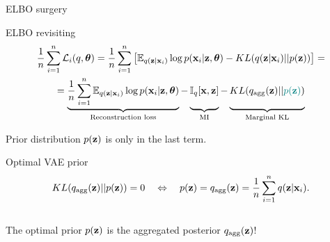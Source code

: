 \begin{frame}{ELBO surgery}
	\begin{block}{ELBO revisiting}
		\vspace{-0.7cm}
		\begin{multline*}
		    \frac{1}{n}\sum_{i=1}^n \cL_i(q, \btheta) = \frac{1}{n} \sum_{i=1}^n \left[ \mathbb{E}_{q(\bz | \bx_i)} \log p(\bx_i | \bz, \btheta) - KL(q(\bz | \bx_i) || p(\bz)) \right] = \\
		    = \underbrace{\frac{1}{n} \sum_{i=1}^n \mathbb{E}_{q(\bz | \bx_i)} \log p(\bx_i | \bz, \btheta)}_{\text{Reconstruction loss}} - \underbrace{\vphantom{ \sum_{i=1}^n} \bbI_q [\bx, \bz]}_{\text{MI}} - \underbrace{\vphantom{ \sum_{i=1}^n} KL(q_{\text{agg}}(\bz) || {\color{teal}p(\bz)})}_{\text{Marginal KL}}
		\end{multline*}
		\vspace{-0.3cm}
	\end{block}
	Prior distribution $p(\mathbf{z})$ is only in the last term.
	\begin{block}{Optimal VAE prior}
		\vspace{-0.7cm}
		\[
	  		KL(q_{\text{agg}}(\mathbf{z}) || p(\mathbf{z})) = 0 \quad \Leftrightarrow \quad p (\mathbf{z}) = q_{\text{agg}}(\mathbf{z}) = \frac{1}{n} \sum_{i=1}^n q(\mathbf{z} | \mathbf{x}_i).
		\]
		\vspace{-0.4cm} \\
		The optimal prior $p(\mathbf{z})$ is the aggregated posterior $q_{\text{agg}}(\mathbf{z})$!
	\end{block}
	
\end{frame}
